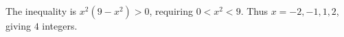 The inequality is $ x^2(9-x^2)>0 $, requiring $ 0<x^2<9 $. Thus $ x=-2,-1,1,2 $, giving $\boxed{4}$ integers.
